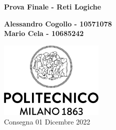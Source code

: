 \begin{titlepage}
    \begin{center}
        \vspace*{1cm}
        
        \Huge
        \textbf{Prova Finale - Reti Logiche}
        
        \vspace{0.5cm}
        \LARGE
    
        \textbf{Alessandro Cogollo - 10571078\\Mario Cela - 10685242}
        
        \vfill
        
        \vspace{1.8cm}
        \includegraphics[width=50mm,scale=0.5]{images/logo.png}
        \vspace{1.0cm}
        \large
        \\Consegna 01 Dicembre 2022
        
    \end{center}
    
\end{titlepage}